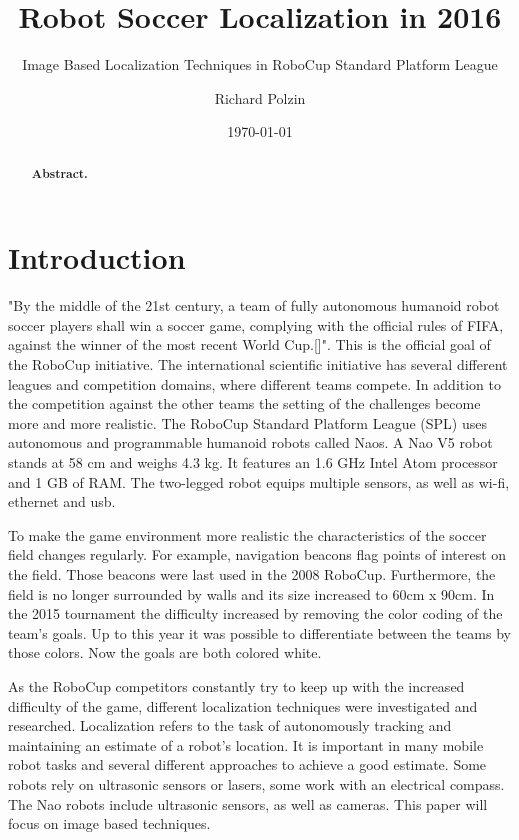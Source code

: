 \documentclass[12pt, a4paper]{scrartcl}
\author{Richard Polzin}
\title{Robot Soccer Localization in 2016}
\subtitle{Image Based Localization Techniques in RoboCup Standard Platform League}
\date{\today}
\begin{document}
  \maketitle

  \begin{abstract}
    \textbf{Abstract.}
  \end{abstract}

  \section{Introduction}
  "By the middle of the 21st century, a team of fully autonomous humanoid robot soccer players shall win a soccer game, complying with the official rules of FIFA, against the winner of the most recent World Cup.[]". This is the official goal of the RoboCup initiative. The international scientific initiative has several different leagues and competition domains, where different teams compete. In addition to the competition against the other teams the setting of the challenges become more and more realistic. The RoboCup Standard Platform League (SPL) uses autonomous and programmable humanoid robots called Naos. A Nao V5 robot stands at 58 cm and weighs 4.3 kg. It features an 1.6 GHz Intel Atom processor and 1 GB of RAM. The two-legged robot equips multiple sensors, as well as wi-fi, ethernet and usb.

  To make the game environment more realistic the characteristics of the soccer field changes regularly. For example, navigation beacons flag points of interest on the field. Those beacons were last used in the 2008 RoboCup. Furthermore, the field is no longer surrounded by walls and its size increased to 60cm x 90cm. In the 2015 tournament the difficulty increased by removing the color coding of the team's goals. Up to this year it was possible to differentiate between the teams by those colors. Now the goals are both colored white.

  As the RoboCup competitors constantly try to keep up with the increased difficulty of the game, different localization techniques were investigated and researched. Localization refers to the task of autonomously tracking and maintaining an estimate of a robot's location. It is important in many mobile robot tasks and several different approaches to achieve a good estimate. Some robots rely on ultrasonic sensors or lasers, some work with an electrical compass. The Nao robots include ultrasonic sensors, as well as cameras. This paper will focus on image based techniques.
\end{document}
